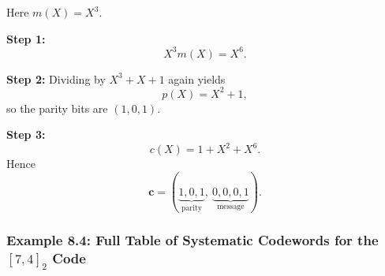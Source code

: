 \documentclass[
]{article}
\begin{document}
Here \(m(X)=X^3\).

\textbf{Step 1:} \[X^3m(X)=X^6.\]

\textbf{Step 2:} Dividing by \(X^3+X+1\) again yields \[p(X)=X^2+1,\] so
the parity bits are \((1,0,1)\).

\textbf{Step 3:} \[c(X)=1+X^2+X^6.\] Hence
\[\mathbf{c}=(\underbrace{1,0,1}_{\text{parity}},\ \underbrace{0,0,0,1}_{\text{message}}).\]

\subsubsection{\texorpdfstring{Example 8.4: Full Table of Systematic
Codewords for the \([7,4]_2\)
Code}{Example 8.4: Full Table of Systematic Codewords for the {[}7,4{]}\_2 Code}}\label{example-8.4-full-table-of-systematic-codewords-for-the-74_2-code}
\end{document}
